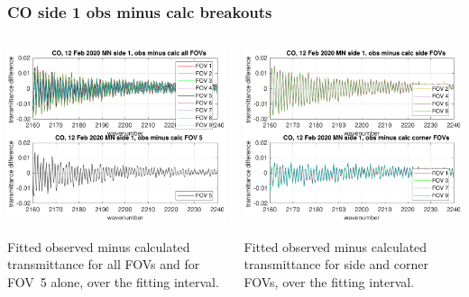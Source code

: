 \documentclass[9pt]{beamer}
\begin{document}
\begin{frame}
\frametitle{CO side 1 obs minus calc breakouts}
\begin{columns}[t]
\begin{column}{0.5\textwidth}
  \begin{centering}
  \includegraphics[width=\textwidth]{02-12_mn_s1_CO/CO_breakout_1.pdf}
  \end{centering}\vspace{3mm}

Fitted observed minus calculated transmittance for all FOVs and for FOV~5
alone, over the fitting interval.

\end{column}
\begin{column}{0.5\textwidth}  
  \begin{centering}
  \includegraphics[width=\textwidth]{02-12_mn_s1_CO/CO_breakout_2.pdf}
  \end{centering}\vspace{3mm}

Fitted observed minus calculated transmittance for side and corner FOVs,
over the fitting interval.

\end{column}
\end{columns}
\end{frame}
\end{document}
